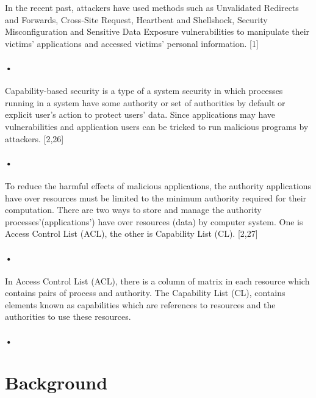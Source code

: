 \documentclass{article}
\begin{document}
In the recent past, attackers have used methods such as Unvalidated Redirects and Forwards, Cross-Site Request, 
Heartbeat and Shellshock, Security Misconfiguration and Sensitive Data Exposure vulnerabilities to manipulate their
victims’ applications and accessed victims’ personal information. [1]\paragraph*{•}



Capability-based security is a type of a system security in which processes running in a system have some authority 
or set of authorities by default or explicit user’s action to protect users’ data. Since applications may have 
vulnerabilities and application users can be tricked to run malicious programs by attackers. [2,26] \paragraph*{•}


To reduce the harmful effects of malicious applications, the authority applications have over resources
must be limited to the minimum authority required for their computation. There are two ways to store and
manage the authority processes’(applications’) have over resources (data) by computer system. One is Access
Control List (ACL), the other is Capability List (CL). [2,27]\paragraph*{•}
In Access Control List (ACL), there is a column of matrix in each resource which contains pairs of process and authority.
The Capability List (CL), contains elements known as capabilities which are references to resources and the authorities
to use these resources.\paragraph*{•}

\section{Background}
\end{document}
